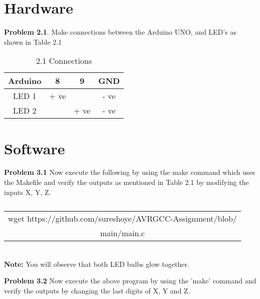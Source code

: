 \documentclass[joirnal,12pt,twocolumn]{IEEEtran}
\begin{document}
\section{Hardware}


\textbf{Problem 2.1}. Make connections between the Arduino UNO, and LED's as shown in Table 2.1 \\

\begin{table}[h]
    \centering
    \begin{tabular}{| c | c | c | c |}
        \hline
         Arduino & 8 & 9 & GND  \\
       \hline
       LED 1 & + ve &  & - ve  \\
        \hline
      LED 2 &  & + ve & - ve  \\
        \hline
         
	\hline
    \end{tabular}
    \caption{2.1 Connections}
    \label{tab:my_label}
\end{table}


\section{Software}

\textbf{Problem 3.1} Now execute the following  by using the make command which uses the Makefile and verify the outputs as mentioned in Table 2.1 by modifying the inputs X, Y, Z.\\
\begin{table}[h]
    \centering
    \begin{tabular}{| c |}
    \hline
    wget https://github.com/sureshoye/AVRGCC-Assignment/blob/\\main/main.c\\
    \hline
    \end{tabular}
    \caption{}
    \label{}
 \end{table}
\\
\textbf{Note:} You will observe that both LED bulbs glow together.

\textbf{Problem 3.2} Now execute the above program by using the 'make' command and verify the outputs by changing the last digits of X, Y and Z.\\
\end{document}
